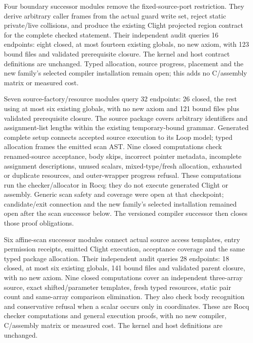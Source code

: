 Four boundary successor modules remove the fixed-source-port restriction.
They derive arbitrary caller frames from the actual guard write set, reject
static private/live collisions, and produce the existing Clight projected
region contract for the complete checked statement. Their independent audit
queries 16 endpoints: eight closed, at most fourteen existing globals, no new
axiom, with 123 bound files and validated prerequisite closure. The kernel and
host contract definitions are unchanged. Typed allocation, source progress,
placement and the new family's selected compiler installation remain open;
this adds no C/assembly matrix or measured cost.

Seven source-factory/resource modules query 32 endpoints: 26 closed, the rest
using at most six existing globals, with no new axiom and 121 bound files plus
validated prerequisite closure. The source package covers arbitrary identifiers
and assignment-list lengths within the existing temporary-bound grammar.
Generated complete setup connects accepted source execution to its Loop model;
typed allocation frames the emitted scan AST. Nine closed computations check
renamed-source acceptance, body skips, incorrect pointer metadata, incomplete
assignment descriptions, unused scalars, mixed-type/fresh allocation, exhausted
or duplicate resources, and outer-wrapper progress refusal. These computations
run the checker/allocator in Rocq; they do not execute generated Clight or
assembly. Generic scan safety and coverage were open at that checkpoint;
candidate/exit connection and the new family's selected installation remained
open after the scan successor below. The versioned compiler successor then
closes those proof obligations.

Six affine-scan successor modules connect actual source access templates,
entry permission receipts, emitted Clight execution, acceptance coverage and
the same typed package allocation. Their independent audit queries 28 endpoints:
18 closed, at most six existing globals, 141 bound files and validated parent
closure, with no new axiom. Nine closed computations cover an
independent three-array source, exact shifted/parameter templates, fresh typed
resources, static pair count and same-array comparison elimination. They also
check body recognition and conservative refusal when a scalar occurs only in
coordinates. These are Rocq checker computations and general execution proofs,
with no new compiler, C/assembly matrix or measured cost. The kernel and host
definitions are unchanged.

